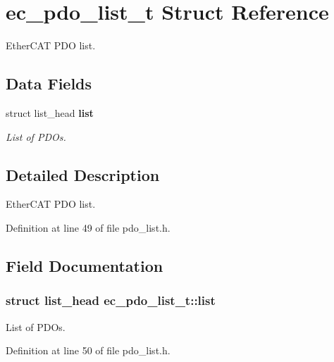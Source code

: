 \section{ec\-\_\-pdo\-\_\-list\-\_\-t Struct Reference}
\label{structec__pdo__list__t}


Ether\-C\-A\-T P\-D\-O list.  


\subsection*{Data Fields}
\begin{DoxyCompactItemize}
\item 
struct list\-\_\-head {\bf list}
\begin{DoxyCompactList}\small\item\em List of P\-D\-Os. \end{DoxyCompactList}\end{DoxyCompactItemize}


\subsection{Detailed Description}
Ether\-C\-A\-T P\-D\-O list. 

Definition at line 49 of file pdo\-\_\-list.\-h.



\subsection{Field Documentation}
\subsubsection[{list}]{\setlength{\rightskip}{0pt plus 5cm}struct list\-\_\-head ec\-\_\-pdo\-\_\-list\-\_\-t\-::list}\label{structec__pdo__list__t_a7889b3f485d92c496fd15e45573cae21}


List of P\-D\-Os. 



Definition at line 50 of file pdo\-\_\-list.\-h.

